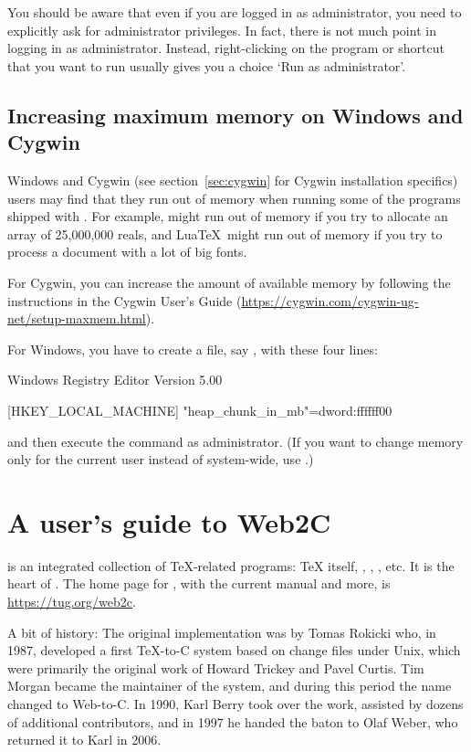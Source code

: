 \documentclass{article}
\begin{document}
You should be aware that even if you are logged in as administrator, you
need to explicitly ask for administrator privileges. In fact, there is
not much point in logging in as administrator. Instead, right-clicking
on the program or shortcut that you want to run usually gives you a
choice `Run as administrator'.


\subsection{Increasing maximum memory on Windows and Cygwin}
\label{sec:cygwin-maxmem}

Windows and Cygwin (see section~\ref{sec:cygwin} for Cygwin installation
specifics) users may find that they run out of memory when running some
of the programs shipped with \TL.  For example,  might run out
of memory if you try to allocate an array of 25,000,000 reals, and
Lua\TeX\ might run out of memory if you try to process a document with a
lot of big fonts.

For Cygwin, you can increase the amount of available memory by following
the instructions in the Cygwin User's Guide
(\url{https://cygwin.com/cygwin-ug-net/setup-maxmem.html}).

For Windows, you have to create a file, say , with
these four lines:

\begin{sverbatim}
Windows Registry Editor Version 5.00

[HKEY_LOCAL_MACHINE\Software\Cygwin]
"heap_chunk_in_mb"=dword:ffffff00
\end{sverbatim}

\noindent and then execute the command  as
administrator.  (If you want to change memory only for the current user
instead of system-wide, use .)


\section{A user's guide to Web2C}

\Webc{} is an integrated collection of \TeX-related programs: \TeX{}
itself, \MF{}, \MP, \BibTeX{}, etc.  It is the heart of \TL{}.  The home
page for \Webc{}, with the current manual and more, is
\url{https://tug.org/web2c}.

A bit of history: The original implementation was by Tomas Rokicki who,
in 1987, developed a first \TeX{}-to-C system based on change files
under Unix, which were primarily the original work of Howard Trickey and
Pavel Curtis.  Tim Morgan became the maintainer of the system, and
during this period the name changed to Web-to-C\@.  In 1990, Karl Berry
took over the work, assisted by dozens of additional contributors, and
in 1997 he handed the baton to Olaf Weber, who returned it to Karl in
2006.
\end{document}
